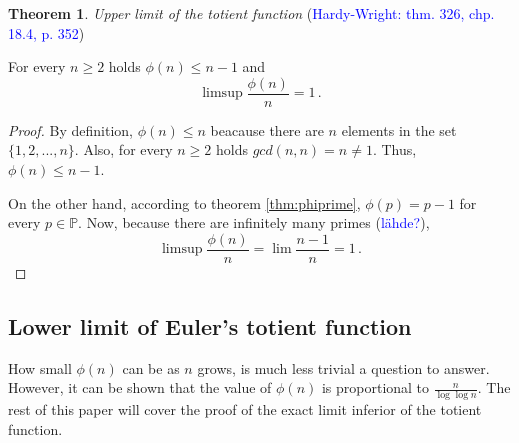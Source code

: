 \documentclass{article}
\theoremstyle{definition}
\newtheorem{theorem}[subsection]{Theorem}
\begin{document}
\begin{theorem}{\emph{Upper limit of the totient function} (\textcolor{blue}{Hardy-Wright: thm. 326, chp. 18.4, p. 352})}

For every $n \geq 2$ holds $\phi(n) \leq n-1$ and
\begin{equation*}
    \limsup{\frac{\phi(n)}{n}} = 1\,.
\end{equation*}

\begin{proof}

By definition, $\phi(n) \leq n$ beacause there are $n$ elements in the set $\{1,2,...,n\}$. Also, for every $n \geq 2$ holds $gcd(n,n) = n \neq 1$. Thus, $\phi(n) \leq n-1$.

On the other hand, according to theorem \ref{thm:phiprime}, $\phi(p) = p-1$ for every $p\in\mathbb{P}$.
Now, because there are infinitely many primes (\textcolor{blue}{lähde?}),
\begin{equation*}
    \limsup{\frac{\phi(n)}{n}} = \lim \frac{n-1}{n} = 1\,.
\end{equation*}

\end{proof}

\end{theorem}

\subsection{Lower limit of Euler's totient function}

How small $\phi(n)$ can be as $n$ grows, is much less trivial a question to answer. However, it can be shown that the value of $\phi(n)$ is proportional to $\frac{n}{\log\log n}$. The rest of this paper will cover the proof of the exact limit inferior of the totient function.
\end{document}
